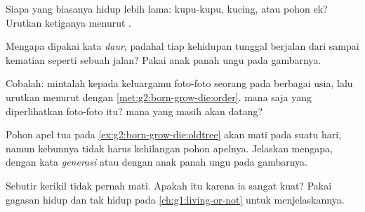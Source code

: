\begin{exercise}[$\star$]\label{exo:g2:born-grow-die:6}
Siapa yang biasanya hidup lebih lama: kupu-kupu, kucing, atau pohon
ek? Urutkan ketiganya menurut .
\end{exercise}

\begin{exercise}[$\star$]\label{exo:g2:born-grow-die:7}
Mengapa dipakai kata \emph{daur}, padahal tiap kehidupan tunggal
berjalan dari  sampai kematian seperti sebuah jalan? Pakai
anak panah ungu pada gambarnya.
\end{exercise}

\begin{exercise}[$\star$]\label{exo:g2:born-grow-die:8}
Cobalah: mintalah kepada keluargamu foto-foto seorang  pada
berbagai usia, lalu urutkan menurut  dengan
\cref{met:g2:born-grow-die:order}.  mana saja yang diperlihatkan
foto-foto itu?  mana yang masih akan datang?
\end{exercise}

\begin{exercise}[$\star\star$]\label{exo:g2:born-grow-die:9}
Pohon apel tua pada \cref{ex:g2:born-grow-die:oldtree} akan mati pada
suatu hari, namun kebunnya tidak harus kehilangan pohon apelnya.
Jelaskan mengapa, dengan kata \emph{generasi} atau dengan anak panah
ungu pada gambarnya.
\end{exercise}

\begin{exercise}[$\star\star$]\label{exo:g2:born-grow-die:10}
Sebutir kerikil tidak pernah mati. Apakah itu karena ia sangat kuat?
Pakai gagasan hidup dan tak hidup pada
\cref{ch:g1:living-or-not} untuk menjelaskannya.
\end{exercise}
